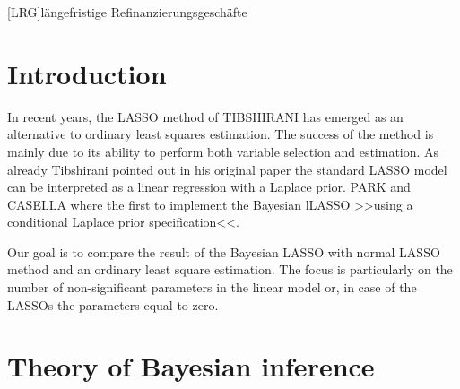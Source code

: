 \documentclass[12pt,a4paper]{article}
\begin{document}
\begin{adjustwidth}{1.5em}{0pt}

\begin{acronym}[dummyyyy]
 [LRG]{längefristige Refinanzierungsgeschäfte}

\end{acronym}

\end{adjustwidth}

\restoregeometry

\newpage
{}
\hypertarget{introduction}{%
\section{Introduction}\label{introduction}}

In recent years, the \ac{LASSO} method of TIBSHIRANI has emerged as an
alternative to ordinary least squares estimation. The success of the
method is mainly due to its ability to perform both variable selection
and estimation. As already Tibshirani pointed out in his original paper
the standard \ac{LASSO} model can be interpreted as a linear regression
with a Laplace prior. PARK and CASELLA where the first to implement the
Bayesian l\ac{LASSO} \textgreater\textgreater using a conditional
Laplace prior specification\textless\textless.

Our goal is to compare the result of the Bayesian \ac{LASSO} with normal
\ac{LASSO} method and an ordinary least square estimation. The focus is
particularly on the number of non-significant parameters in the linear
model or, in case of the \acp{LASSO} the parameters equal to zero.

\newpage

\hypertarget{theory-of-bayesian-inference}{%
\section{Theory of Bayesian
inference}\label{theory-of-bayesian-inference}}
\end{document}

